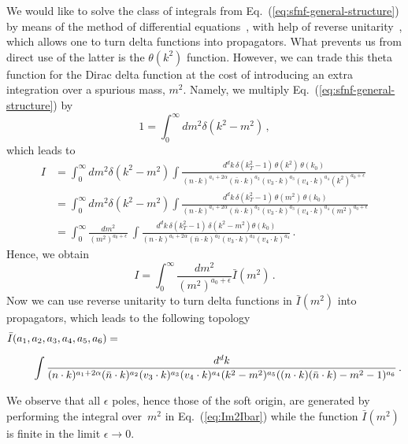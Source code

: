 \documentclass[a4paper,11pt]{article}
\newcommand{\nbar}{\ensuremath{\bar{n}}}
\numberwithin{equation}{section}
\begin{document}
We would like to solve the class of integrals from
Eq.~(\ref{eq:sfnf-general-structure}) by means of the method of differential
equations~\cite{Kotikov:1990kg, Remiddi:1997ny}, with help of
reverse unitarity~\cite{Anastasiou:2002yz}, which allows one to turn delta
functions into propagators.
%
What prevents us from direct use of the latter is the $\theta(k^2)$ function.
However, we can trade this theta function for the Dirac delta function at the
cost of introducing an extra integration over a spurious mass, $m^2$. Namely, we
multiply Eq.~(\ref{eq:sfnf-general-structure}) by 
%
\begin{equation}
  1 = \int_0^\infty dm^2 \delta(k^2-m^2)\,,
\end{equation}
%
which leads to
\begin{align}
  I & = \int_0^\infty dm^2 \delta(k^2-m^2)
      \int\frac{d^d k\, \delta(k_T^2-1)\, \theta(k^2)\, \theta(k_0)}
      {(n\cdot k)^{a_1+2\alpha} (\nbar\cdot k)^{a_2} (v_3 \cdot k)^{a_3} (v_4
      \cdot k)^{a_4} (k^2)^{a_0+\epsilon}}
    \nonumber \\
    & = \int_0^\infty dm^2 \delta(k^2-m^2)
      \int\frac{d^d k\, \delta(k_T^2-1)\, \theta(m^2)\, \theta(k_0)}
      {(n\cdot k)^{a_1+2\alpha} (\nbar\cdot k)^{a_2} (v_3 \cdot k)^{a_3} (v_4
      \cdot k)^{a_4} (m^2)^{a_0+\epsilon}}
    \nonumber \\
    & = \int_0^\infty \frac{dm^2}{(m^2)^{a_0+\epsilon}}\
      \int\frac{d^d k\, \delta(k_T^2-1)\,\delta(k^2-m^2)  \theta(k_0)}
      {(n\cdot k)^{a_1+2\alpha} (\nbar\cdot k)^{a_2} (v_3 \cdot k)^{a_3} (v_4
      \cdot k)^{a_4}}\,.
  \label{eq:IandIbardef}
\end{align}
%
Hence, we obtain
%
\begin{equation}
  I =\int_0^\infty \frac{dm^2}{(m^2)^{a_0+\epsilon}} \bar I (m^2)\,.
  \label{eq:Im2Ibar}
\end{equation}
%
Now we can use reverse unitarity to turn delta functions in $\bar I(m^2)$
into propagators, which leads to the following topology
%
\begin{align}
  \label{eq:topology-bubble}
  \bar I(a_1, a_2, a_3, a_4, a_5, a_6)  
  & =   \\[0.5em] 
  &  \hspace{-70pt}
  \int \frac{d^d k}
  {(n\cdot k)^{a_1+2\alpha} (\nbar\cdot k)^{a_2} (v_3 \cdot k)^{a_3} (v_4
  \cdot k)^{a_4} (k^2-m^2)^{a_5} ((n\cdot k)(\nbar \cdot k)-m^2-1)^{a_6}}\,.
  \nonumber
\end{align}

We observe that all $\epsilon$ poles, hence those of the soft origin,
are generated by performing the integral over~$m^2$ in Eq.~(\ref{eq:Im2Ibar})
while the function $\bar I(m^2)$ is finite in the limit $\epsilon \to 0$.
\end{document}
